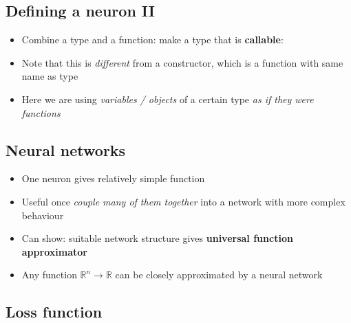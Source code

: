 \hypertarget{defining-a-neuron-ii}{%
\subsection{Defining a neuron II}\label{defining-a-neuron-ii}}

\begin{itemize}
\item
  Combine a type and a function: make a type that is \textbf{callable}:

\begin{Shaded}
\begin{Highlighting}[]



\NormalTok{, }\NormalTok{)}
\NormalTok{)}
\end{Highlighting}
\end{Shaded}
\item
  Note that this is \emph{different} from a constructor, which is a
  function with same name as type
\item
  Here we are using \emph{variables / objects} of a certain type
  \emph{as if they were functions}
\end{itemize}

\hypertarget{neural-networks-1}{%
\subsection{Neural networks}\label{neural-networks-1}}

\begin{itemize}
\item
  One neuron gives relatively simple function
\item
  Useful once \emph{couple many of them together} into a network with
  more complex behaviour
\item
  Can show: suitable network structure gives \textbf{universal function
  approximator}
\item
  Any function \(\mathbb{R}^n \to \mathbb{R}\) can be closely
  approximated by a neural network
\end{itemize}

\hypertarget{loss-function}{%
\subsection{Loss function}\label{loss-function}}

